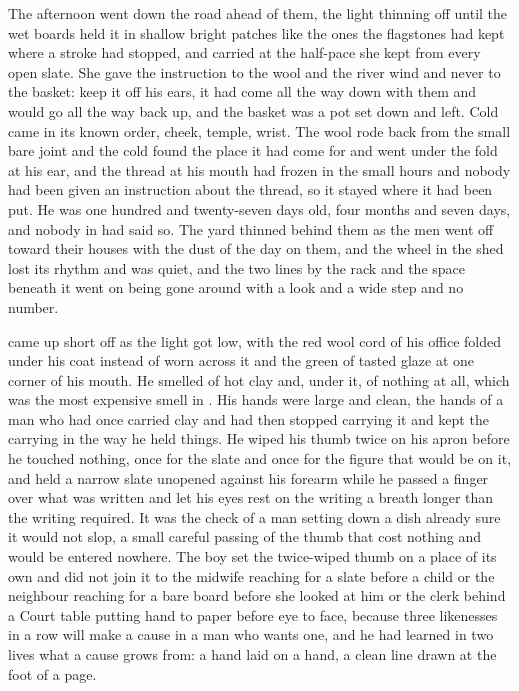 The afternoon went down the road ahead of them, the light thinning off  until the wet boards held it in shallow bright patches like the ones the flagstones had kept where a stroke had stopped, and  carried  at the half-pace she kept from every open slate. She gave the instruction to the wool and the river wind and never to the basket: keep it off his ears, it had come all the way down with them and would go all the way back up, and the basket was a pot set down and left. Cold came in its known order, cheek, temple, wrist. The wool rode back from the small bare joint and the cold found the place it had come for and went under the fold at his ear, and the thread at his mouth had frozen in the small hours and nobody had been given an instruction about the thread, so it stayed where it had been put. He was one hundred and twenty-seven days old, four months and seven days, and nobody in  had said so. The yard thinned behind them as the men went off toward their houses with the dust of the day on them, and the wheel in the shed lost its rhythm and was quiet, and the two lines by the rack and the space beneath it went on being gone around with a look and a wide step and no number.

 came up short off  as the light got low, with the red wool cord of his office folded under his coat instead of worn across it and the green of tasted glaze at one corner of his mouth. He smelled of hot clay and, under it, of nothing at all, which was the most expensive smell in . His hands were large and clean, the hands of a man who had once carried clay and had then stopped carrying it and kept the carrying in the way he held things. He wiped his thumb twice on his apron before he touched nothing, once for the slate and once for the figure that would be on it, and held a narrow slate unopened against his forearm while he passed a finger over what was written and let his eyes rest on the writing a breath longer than the writing required. It was the check of a man setting down a dish already sure it would not slop, a small careful passing of the thumb that cost nothing and would be entered nowhere. The boy set the twice-wiped thumb on a place of its own and did not join it to the midwife reaching for a slate before a child or the neighbour reaching for a bare board before she looked at him or the clerk behind a Court table putting hand to paper before eye to face, because three likenesses in a row will make a cause in a man who wants one, and he had learned in two lives what a cause grows from: a hand laid on a hand, a clean line drawn at the foot of a page.

